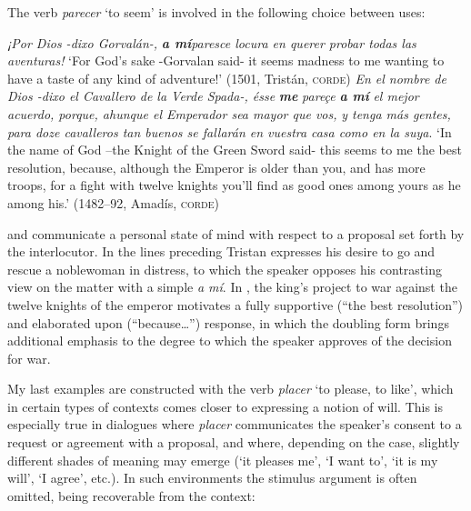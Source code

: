 \documentclass[output=paper]{LSP/langsci}
\begin{document}
 The verb \textit{parecer} ‘to seem’ is involved in the following choice between uses:

\begin{exe}
\ex%
\label{04-me-ex:17}
\begin{xlist}
\ex%
\label{04-me-ex:17a}
\textit{¡Por Dios -dixo Gorvalán-,} \textbf{\textit{a mí}}\textit{paresce locura en querer probar todas las} \textit{aventuras!}
\glt ‘For God’s sake -Gorvalan said- it seems madness to me wanting to have a taste of any kind of adventure!’ (1501, Tristán, \textsc{corde})
\ex%
\label{04-me-ex:17b}
\textit{En el nombre de Dios -dixo el Cavallero de la Verde Spada-, ésse} \textbf{\textit{me}} \textit{pareçe} \textbf{\textit{a mí}} \textit{el mejor acuerdo, porque, ahunque el Emperador sea mayor que vos,} \textit{y tenga más gentes, para doze cavalleros tan buenos se fallarán en vuestra} \textit{casa como en la suya}.
\glt ‘In the name of God –the Knight of the Green Sword said- this seems to me the best resolution, because, although the Emperor is older than you, and has more troops, for a fight with twelve knights you’ll find as good ones among yours as he among his.’ (1482–92, Amadís, \textsc{corde)} 
\end{xlist}
\end{exe}

 and  communicate a personal state of mind with respect to a proposal set forth by the interlocutor. In the lines preceding  Tristan expresses his desire to go and rescue a noblewoman in distress, to which the speaker opposes his contrasting view on the matter with a simple \textit{a mí}. In , the king’s project to war against the twelve knights of the emperor motivates a fully supportive (“the best resolution”) and elaborated upon (“because…”) response, in which the doubling form brings additional emphasis to the degree to which the speaker approves of the decision for war.

 My last examples are constructed with the verb \textit{placer} ‘to please, to like’, which in certain types of contexts comes closer to expressing a notion of will. This is especially true in dialogues where \textit{placer} communicates the speaker’s consent to a request or agreement with a proposal, and where, depending on the case, slightly different shades of meaning may emerge (‘it pleases me’, ‘I want to’, ‘it is my will’, ‘I agree’, etc.). In such environments the stimulus argument is often omitted, being recoverable from the context:
\end{document}
